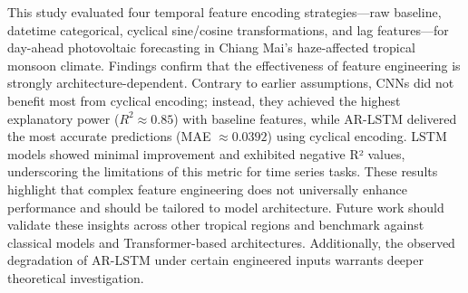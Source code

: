 \documentclass[conference]{IEEEtran}
\begin{document}
	This study evaluated four temporal feature encoding strategies—raw baseline, datetime categorical, cyclical sine/cosine transformations, and lag features—for day-ahead photovoltaic forecasting in Chiang Mai’s haze-affected tropical monsoon climate. Findings confirm that the effectiveness of feature engineering is strongly architecture-dependent. Contrary to earlier assumptions, CNNs did not benefit most from cyclical encoding; instead, they achieved the highest explanatory power ($R^{2} \approx\allowbreak 0.85$) with baseline features, while AR-LSTM delivered the most accurate predictions (MAE $\approx\allowbreak 0.0392$) using cyclical encoding. LSTM models showed minimal improvement and exhibited negative R² values, underscoring the limitations of this metric for time series tasks. These results highlight that complex feature engineering does not universally enhance performance and should be tailored to model architecture. Future work should validate these insights across other tropical regions and benchmark against classical models and Transformer-based architectures. Additionally, the observed degradation of AR-LSTM under certain engineered inputs warrants deeper theoretical investigation.

	
	\balance
	
	
	
	
\end{document}
